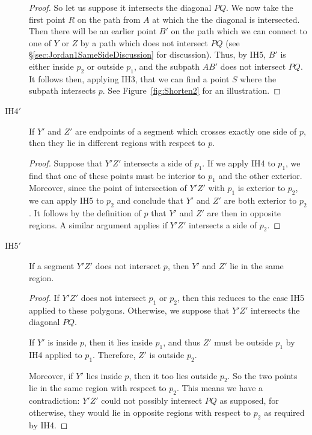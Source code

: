 \begin{description}
\begin{proof}
So let us suppose it intersects the diagonal $PQ$. We now take the first point $R$ on the path from $A$ at which the the diagonal is intersected. Then there will be an earlier point $B'$ on the path which we can connect to one of $Y$ or $Z$ by a path which does not intersect $PQ$ (see \S\ref{sec:Jordan1SameSideDiscussion} for discussion). Thus, by IH5, $B'$ is either inside $p_2$ or outside $p_1$, and the subpath $AB'$ does not intersect $PQ$. It follows then, applying IH3, that we can find a point $S$ where the subpath intersects $p$. See Figure~\ref{fig:Shorten2} for an illustration.
  \end{proof}

\item[IH4$'$] If $Y'$ and $Z'$ are endpoints of a segment which crosses exactly one side of $p$, then they lie in different regions with respect to $p$.
  \begin{proof}
     Suppose that $Y'Z'$ intersects a side of $p_1$. If we apply IH4 to $p_1$, we find that one of these points must be interior to $p_1$ and the other exterior. Moreover, since the point of intersection of $Y'Z'$ with $p_1$ is exterior to $p_2$, we can apply IH5 to $p_2$ and conclude that $Y'$ and $Z'$ are both exterior to $p_2$. It follows by the definition of $p$ that $Y'$ and $Z'$ are then in opposite regions. A similar argument applies if $Y'Z'$ intersects a side of $p_2$.
  \end{proof}
\item[IH5$'$] If a segment $Y'Z'$ does not intersect $p$, then $Y'$ and $Z'$ lie in the same region.
  \begin{proof}
    If $Y'Z'$ does not intersect $p_1$ or $p_2$, then this reduces to the case IH5 applied to these polygons. Otherwise, we suppose that $Y'Z'$ intersects the diagonal $PQ$. 

    If $Y'$ is inside $p$, then it lies inside $p_1$, and thus $Z'$ must be outside $p_1$ by IH4 applied to $p_1$. Therefore, $Z'$ is outside $p_2$. 

Moreover, if $Y'$ lies inside $p$, then it too lies outside $p_2$. So the two points lie in the same region with respect to $p_2$. This means we have a contradiction: $Y'Z'$ could not possibly intersect $PQ$ as supposed, for otherwise, they would lie in opposite regions with respect to $p_2$ as required by IH4.


\end{proof}
\end{description}
